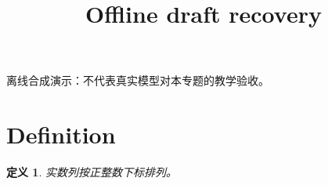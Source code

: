 \documentclass[UTF8,fontset=fandol,11pt]{ctexart}
\title{Offline draft recovery}
\date{}
\newtheorem{definition}{定义}[section]
\begin{document}
\maketitle
\par\noindent 离线合成演示：不代表真实模型对本专题的教学验收。\par
\section{Definition}\label{sec:S01}
\begin{definition}
实数列按正整数下标排列。
\end{definition}
\end{document}
